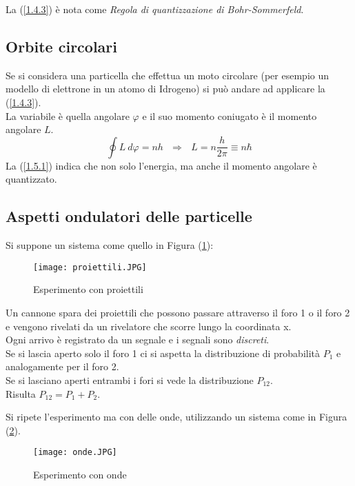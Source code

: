 \documentclass[twoside]{article}
\begin{document}
La (\ref{1.4.3}) è nota come \textit{Regola di quantizzazione di Bohr-Sommerfeld}.


\subsection{Orbite circolari}
Se si considera una particella che effettua un moto circolare (per esempio un modello di elettrone in un atomo di Idrogeno) si può andare ad applicare la (\ref{1.4.3}).
\\
La variabile è quella angolare $\varphi$ e il suo momento coniugato è il momento angolare $L$.
\begin{equation} \label{1.5.1}
    \oint L \ d\varphi =nh \ \ \ \Rightarrow \ \ \ L=n\frac{h}{2\pi}\equiv n\hbar
\end{equation}
La (\ref{1.5.1}) indica che non solo l'energia, ma anche il momento angolare è quantizzato.

\vspace{0.3cm}

\subsection{Aspetti ondulatori delle particelle}

Si suppone un sistema come quello in Figura (\ref{proiettili}):

\begin{figure}[ht]
\centering
\texttt{[image: proiettili.JPG]}
\caption{Esperimento con proiettili}
\label{proiettili}
\end{figure}

Un cannone spara dei proiettili che possono passare attraverso il foro 1 o il foro 2 e vengono rivelati da un rivelatore che scorre lungo la coordinata x.
\\
Ogni arrivo è registrato da un segnale e i segnali sono \textit{discreti}.
\\
Se si lascia aperto solo il foro 1 ci si aspetta la distribuzione di probabilità $P_1$ e analogamente per il foro 2.
\\
Se si lasciano aperti entrambi i fori si vede la distribuzione $P_{12}$.
\\
Risulta $P_{12}=P_1 + P_2$.


Si ripete l'esperimento ma con delle onde, utilizzando un sistema come in Figura (\ref{onde}).

\begin{figure}[!h]
\centering
\texttt{[image: onde.JPG]}
\caption{Esperimento con onde}
\label{onde}
\end{figure}
\end{document}

